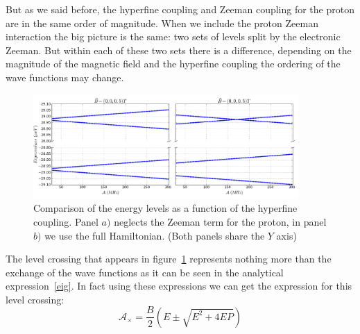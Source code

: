 But as we said before, the hyperfine coupling and Zeeman coupling for the proton are in the same order of magnitude. When we include the proton Zeeman interaction the big picture is the same: two sets of levels split by the electronic Zeeman. But within each of these two sets there is a difference, depending on the magnitude of the magnetic field and the hyperfine coupling the ordering of the wave functions may change. 
\begin{figure}[h!]
\centering
\includegraphics[width=0.9\textwidth]{chapter03/figures/pro_nopro.png}
\vspace{-5pt}
\renewcommand{\figurename}{\footnotesize{\textsc{Figure}}}
\caption{Comparison of the energy levels as a function of the hyperfine coupling. Panel $a)$ neglects the Zeeman term for the proton, in panel $b)$ we use the full Hamiltonian. (Both panels share the $Y$ axis)}
\label{proton}
\end{figure}
\FloatBarrier
The level crossing that appears in figure~\ref{proton} represents nothing more than the exchange of the wave functions as it can be seen in the analytical expression~\eqref{eig}. In fact using these expressions we can get the expression for this level crossing:
\begin{equation}
  \mathcal{A}_{\times}=\frac{B}{2}\left(E\pm\sqrt{E^2+4EP}\right)
\end{equation}


